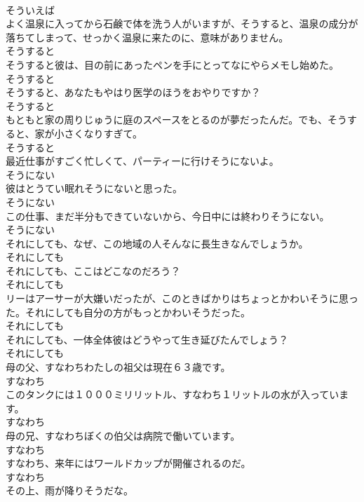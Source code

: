 \documentclass[8pt]{extreport}
\begin{document}
\begin{CJK}{UTF8}{min}
\\	そういえば	
\\	よく温泉に入ってから石鹸で体を洗う人がいますが、そうすると、温泉の成分が落ちてしまって、せっかく温泉に来たのに、意味がありません。	
\\	そうすると	
\\	そうすると彼は、目の前にあったペンを手にとってなにやらメモし始めた。	
\\	そうすると	
\\	そうすると、あなたもやはり医学のほうをおやりですか？	
\\	そうすると	
\\	もともと家の周りじゅうに庭のスペースをとるのが夢だったんだ。でも、そうすると、家が小さくなりすぎて。	
\\	そうすると	
\\	最近仕事がすごく忙しくて、パーティーに行けそうにないよ。	
\\	そうにない	
\\	彼はとうてい眠れそうにないと思った。	
\\	そうにない	
\\	この仕事、まだ半分もできていないから、今日中には終わりそうにない。	
\\	そうにない	
\\	それにしても、なぜ、この地域の人そんなに長生きなんでしょうか。	
\\	それにしても	
\\	それにしても、ここはどこなのだろう？	
\\	それにしても	
\\	リーはアーサーが大嫌いだったが、このときばかりはちょっとかわいそうに思った。それにしても自分の方がもっとかわいそうだった。	
\\	それにしても	
\\	それにしても、一体全体彼はどうやって生き延びたんでしょう？	
\\	それにしても	
\\	母の父、すなわちわたしの祖父は現在６３歳です。	
\\	すなわち	
\\	このタンクには１０００ミリリットル、すなわち１リットルの水が入っています。	
\\	すなわち	
\\	母の兄、すなわちぼくの伯父は病院で働いています。	
\\	すなわち	
\\	すなわち、来年にはワールドカップが開催されるのだ。	
\\	すなわち	
\\	その上、雨が降りそうだな。	

\end{CJK}
\end{document}
